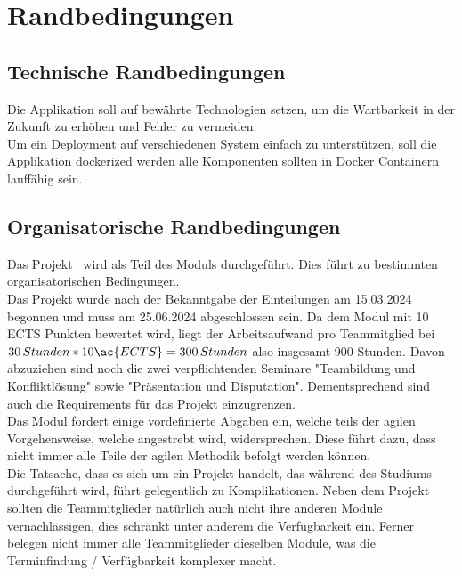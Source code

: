 \chapter{Randbedingungen}\label{ch:randbedingungen}


\section{Technische Randbedingungen}\label{sec:technische-randbedingungen}

Die Applikation soll auf bewährte Technologien setzen, um die Wartbarkeit in der Zukunft zu erhöhen und Fehler zu vermeiden.\\
Um ein Deployment auf verschiedenen System einfach zu unterstützen, soll die Applikation dockerized werden
\dah alle Komponenten sollten in Docker Containern lauffähig sein.


\section{Organisatorische Randbedingungen}\label{sec:organisatorische-randbedingungen}

Das Projekt \workTitel~wird als Teil des Moduls \workTyp durchgeführt.
Dies führt zu bestimmten organisatorischen Bedingungen.\\
Das Projekt wurde nach der Bekanntgabe der Einteilungen am 15.03.2024 begonnen und muss am 25.06.2024 abgeschlossen sein.
Da dem Modul mit 10 \ac{ECTS} Punkten bewertet wird, liegt der Arbeitsaufwand pro Teammitglied bei \(30\,Stunden * 10 \ac{ECTS} = 300\,Stunden\) also insgesamt 900 Stunden.
Davon abzuziehen sind noch die zwei verpflichtenden Seminare "Teambildung und Konfliktlösung" sowie "Präsentation und Disputation".
Dementsprechend sind auch die Requirements für das Projekt einzugrenzen.\\

Das Modul fordert einige vordefinierte Abgaben ein, welche teils der agilen Vorgehensweise, welche angestrebt wird, widersprechen.
Diese führt dazu, dass nicht immer alle Teile der agilen Methodik befolgt werden können.\\

Die Tatsache, dass es sich um ein Projekt handelt, das während des Studiums durchgeführt wird, führt gelegentlich zu Komplikationen.
Neben dem Projekt sollten die Teammitglieder natürlich auch nicht ihre anderen Module vernachlässigen, dies schränkt unter anderem die Verfügbarkeit ein.
Ferner belegen nicht immer alle Teammitglieder dieselben Module, was die Terminfindung / Verfügbarkeit komplexer macht.